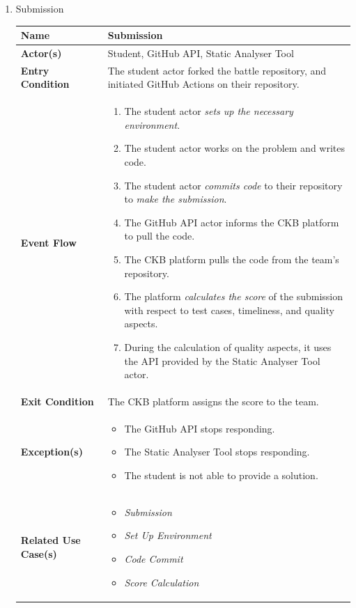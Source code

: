 \begin{enumerate}
\item Submission
\begin{center}
    \begin{tabular}{ | m{10em} | m{10cm}| } 
      \hline
      \textbf{Name} & Submission  \\ 
      \hline
      \textbf{Actor(s)} & Student, GitHub API, Static Analyser Tool \\ 
      \hline
      \textbf{Entry Condition} & The student actor forked the battle repository, and initiated GitHub Actions on their repository. \\ 
      \hline
      \textbf{Event Flow} & 
          \begin{enumerate}[(1)]
              \item The student actor \textit{sets up the necessary environment}.
              \item The student actor works on the problem and writes code. 
              \item The student actor \textit{commits code} to their repository to \textit{make the submission}.
              \item The GitHub API actor informs the CKB platform to pull the code.
              \item The CKB platform pulls the code from the team's repository.
              \item The platform \textit{calculates the score} of the submission with respect to test cases, timeliness, and quality aspects. 
              \item During the calculation of quality aspects, it uses the API provided by the Static Analyser Tool actor.
          \end{enumerate}
      \\ 
      \hline
      \textbf{Exit Condition} & The CKB platform assigns the score to the team. \\ 
      \hline
      \textbf{Exception(s)} & 
      \begin{itemize}
          \item The GitHub API stops responding.
          \item The Static Analyser Tool stops responding.
          \item The student is not able to provide a solution.
      \end{itemize}
          \\ 
      \hline
      \textbf{Related Use Case(s)} & 
      \begin{itemize}
          \item \textit{Submission}
          \item \textit{Set Up Environment}
          \item \textit{Code Commit}
          \item \textit{Score Calculation}
      \end{itemize}
          \\ 
      \hline
    \end{tabular}
    \label{tbl:uc14}
\end{center}


\end{enumerate}
